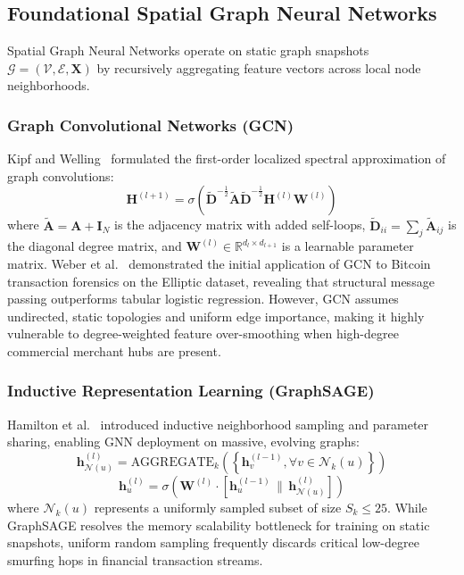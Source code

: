 \subsection{Foundational Spatial Graph Neural Networks}
Spatial Graph Neural Networks operate on static graph snapshots $\mathcal{G} = (\mathcal{V}, \mathcal{E}, \mathbf{X})$ by recursively aggregating feature vectors across local node neighborhoods.

\subsubsection{Graph Convolutional Networks (GCN)}
Kipf and Welling~\cite{kipf2017semi} formulated the first-order localized spectral approximation of graph convolutions:
\begin{equation}
\mathbf{H}^{(l+1)} = \sigma\left( \mathbf{\tilde{D}}^{-\frac{1}{2}} \mathbf{\tilde{A}} \mathbf{\tilde{D}}^{-\frac{1}{2}} \mathbf{H}^{(l)} \mathbf{W}^{(l)} \right)
\end{equation}
where $\mathbf{\tilde{A}} = \mathbf{A} + \mathbf{I}_N$ is the adjacency matrix with added self-loops, $\mathbf{\tilde{D}}_{ii} = \sum_j \mathbf{\tilde{A}}_{ij}$ is the diagonal degree matrix, and $\mathbf{W}^{(l)} \in \mathbb{R}^{d_l \times d_{l+1}}$ is a learnable parameter matrix. Weber et al.~\cite{weber2019anti} demonstrated the initial application of GCN to Bitcoin transaction forensics on the Elliptic dataset, revealing that structural message passing outperforms tabular logistic regression. However, GCN assumes undirected, static topologies and uniform edge importance, making it highly vulnerable to degree-weighted feature over-smoothing when high-degree commercial merchant hubs are present.

\subsubsection{Inductive Representation Learning (GraphSAGE)}
Hamilton et al.~\cite{hamilton2017inductive} introduced inductive neighborhood sampling and parameter sharing, enabling GNN deployment on massive, evolving graphs:
\begin{equation}
\mathbf{h}_{\mathcal{N}(u)}^{(l)} = \text{AGGREGATE}_k\left( \left\{ \mathbf{h}_v^{(l-1)}, \forall v \in \mathcal{N}_k(u) \right\} \right)
\end{equation}
\begin{equation}
\mathbf{h}_u^{(l)} = \sigma\left( \mathbf{W}^{(l)} \cdot \left[ \mathbf{h}_u^{(l-1)} \,\|\, \mathbf{h}_{\mathcal{N}(u)}^{(l)} \right] \right)
\end{equation}
where $\mathcal{N}_k(u)$ represents a uniformly sampled subset of size $S_k \le 25$. While GraphSAGE resolves the memory scalability bottleneck for training on static snapshots, uniform random sampling frequently discards critical low-degree smurfing hops in financial transaction streams.

